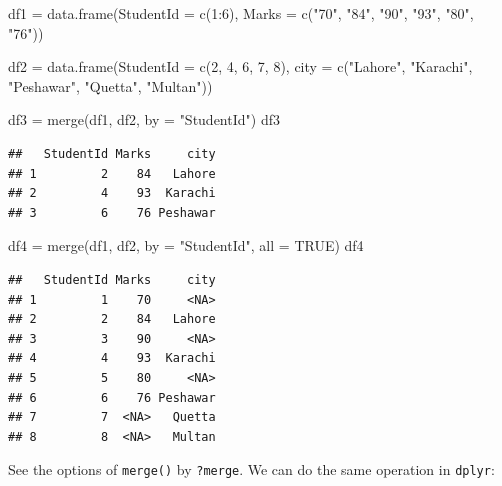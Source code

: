 \documentclass[
]{book}
\newenvironment{Shaded}{\begin{snugshade}}{\end{snugshade}}
\newcommand{\AttributeTok}[1]{\textcolor[rgb]{0.77,0.63,0.00}{#1}}
\newcommand{\ConstantTok}[1]{\textcolor[rgb]{0.00,0.00,0.00}{#1}}
\newcommand{\DecValTok}[1]{\textcolor[rgb]{0.00,0.00,0.81}{#1}}
\newcommand{\FunctionTok}[1]{\textcolor[rgb]{0.00,0.00,0.00}{#1}}
\newcommand{\NormalTok}[1]{#1}
\newcommand{\OtherTok}[1]{\textcolor[rgb]{0.56,0.35,0.01}{#1}}
\newcommand{\SpecialCharTok}[1]{\textcolor[rgb]{0.00,0.00,0.00}{#1}}
\newcommand{\StringTok}[1]{\textcolor[rgb]{0.31,0.60,0.02}{#1}}
\begin{document}
\begin{Shaded}
\begin{Highlighting}[]
\NormalTok{df1 }\OtherTok{=} \FunctionTok{data.frame}\NormalTok{(}\AttributeTok{StudentId =} \FunctionTok{c}\NormalTok{(}\DecValTok{1}\SpecialCharTok{:}\DecValTok{6}\NormalTok{), }
                 \AttributeTok{Marks =} \FunctionTok{c}\NormalTok{(}\StringTok{"70"}\NormalTok{, }\StringTok{"84"}\NormalTok{, }\StringTok{"90"}\NormalTok{, }\StringTok{"93"}\NormalTok{, }\StringTok{"80"}\NormalTok{, }\StringTok{"76"}\NormalTok{))}

\NormalTok{df2 }\OtherTok{=} \FunctionTok{data.frame}\NormalTok{(}\AttributeTok{StudentId =} \FunctionTok{c}\NormalTok{(}\DecValTok{2}\NormalTok{, }\DecValTok{4}\NormalTok{, }\DecValTok{6}\NormalTok{, }\DecValTok{7}\NormalTok{, }\DecValTok{8}\NormalTok{), }
                 \AttributeTok{city =} \FunctionTok{c}\NormalTok{(}\StringTok{"Lahore"}\NormalTok{, }\StringTok{"Karachi"}\NormalTok{, }\StringTok{"Peshawar"}\NormalTok{, }\StringTok{"Quetta"}\NormalTok{, }\StringTok{"Multan"}\NormalTok{)) }

\NormalTok{df3 }\OtherTok{=} \FunctionTok{merge}\NormalTok{(df1, df2, }\AttributeTok{by =} \StringTok{"StudentId"}\NormalTok{)}
\NormalTok{df3}
\end{Highlighting}
\end{Shaded}

\begin{verbatim}
##   StudentId Marks     city
## 1         2    84   Lahore
## 2         4    93  Karachi
## 3         6    76 Peshawar
\end{verbatim}

\begin{Shaded}
\begin{Highlighting}[]
\NormalTok{df4 }\OtherTok{=} \FunctionTok{merge}\NormalTok{(df1, df2, }\AttributeTok{by =} \StringTok{"StudentId"}\NormalTok{, }\AttributeTok{all =} \ConstantTok{TRUE}\NormalTok{)}
\NormalTok{df4}
\end{Highlighting}
\end{Shaded}

\begin{verbatim}
##   StudentId Marks     city
## 1         1    70     <NA>
## 2         2    84   Lahore
## 3         3    90     <NA>
## 4         4    93  Karachi
## 5         5    80     <NA>
## 6         6    76 Peshawar
## 7         7  <NA>   Quetta
## 8         8  <NA>   Multan
\end{verbatim}

See the options of \texttt{merge()} by \texttt{?merge}. We can do the same operation in \texttt{dplyr}:
\end{document}
